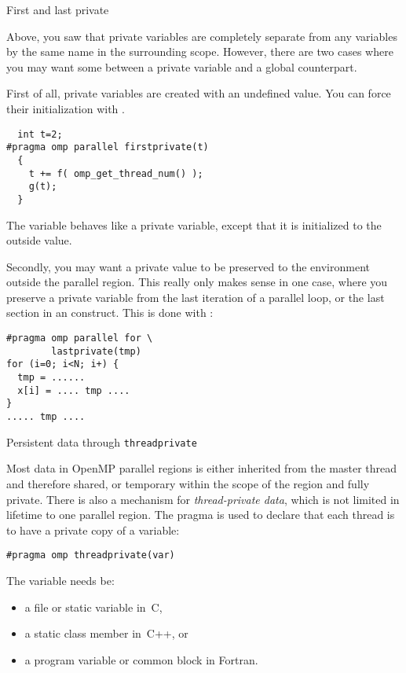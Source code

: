  {First and last private}

Above, you saw that private variables are completely separate from any
variables by the same name in the surrounding scope. However, there
are two cases where you may want some 
between a private variable and a global counterpart.

First of all, private variables are created with an undefined value.
You can force their initialization with .
\begin{lstlisting}
  int t=2;
#pragma omp parallel firstprivate(t)
  {
    t += f( omp_get_thread_num() );
    g(t);
  }
\end{lstlisting}
The variable  behaves like a private variable, except that it is
initialized to the outside value.

Secondly, you may want a private value to be preserved to the
environment outside the parallel region. This really only makes sense
in one case, where you
preserve a private variable
from the last iteration of a parallel loop, or the last section in an
 construct. This is done with :
\begin{lstlisting}
#pragma omp parallel for \
        lastprivate(tmp)
for (i=0; i<N; i+) {
  tmp = ......
  x[i] = .... tmp ....
}
..... tmp ....
\end{lstlisting}

 {Persistent data through \texttt{threadprivate}}
\label{sec:threadprivate}

Most data in OpenMP parallel regions is either inherited
from the master thread and therefore shared, or temporary within the scope of the
region and fully private.
There is also a mechanism for \emph{thread-private
  data},
which is not limited in lifetime to one parallel region.
The  pragma is used to declare that each thread
is to have a private copy of a variable:
\begin{lstlisting}
#pragma omp threadprivate(var)
\end{lstlisting}
The variable needs be:
\begin{itemize}
\item a file or static variable in~C,
\item a static class member in~C++, or
\item a program variable or common block in Fortran.
\end{itemize}

